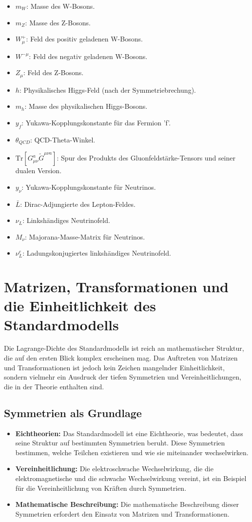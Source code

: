 \documentclass{article}
\begin{document}
\begin{itemize}
		\item $m_W$: Masse des W-Bosons.
		\item $m_Z$: Masse des Z-Bosons.
		\item $W_\mu^+$: Feld des positiv geladenen W-Bosons.
		\item $W^{-\mu}$: Feld des negativ geladenen W-Bosons.
		\item $Z_\mu$: Feld des Z-Bosons.
		\item $h$: Physikalisches Higgs-Feld (nach der Symmetriebrechung).
		\item $m_h$: Masse des physikalischen Higgs-Bosons.
		\item $y_f$: Yukawa-Kopplungskonstante für das Fermion 'f'.
		\item $\theta_{QCD}$: QCD-Theta-Winkel.
		\item $\text{Tr}[G_{\mu\nu}^a \tilde{G}^{\mu\nu a}]$: Spur des Produkts des Gluonfeldstärke-Tensors und seiner dualen Version.
		\item $y_\nu$: Yukawa-Kopplungskonstante für Neutrinos.
		\item $\bar{L}$: Dirac-Adjungierte des Lepton-Feldes.
		\item $\nu_L$: Linkshändiges Neutrinofeld.
		\item $M_\nu$: Majorana-Masse-Matrix für Neutrinos.
		\item $\nu_L^c$: Ladungskonjugiertes linkshändiges Neutrinofeld.
	\end{itemize} %
	\section{Matrizen, Transformationen und die Einheitlichkeit des Standardmodells}
	
	Die Lagrange-Dichte des Standardmodells ist reich an mathematischer Struktur, die auf den ersten Blick komplex erscheinen mag. Das Auftreten von Matrizen und Transformationen ist jedoch kein Zeichen mangelnder Einheitlichkeit, sondern vielmehr ein Ausdruck der tiefen Symmetrien und Vereinheitlichungen, die in der Theorie enthalten sind.
	
	\subsection{Symmetrien als Grundlage}
	
	\begin{itemize}
		\item \textbf{Eichtheorien:} Das Standardmodell ist eine Eichtheorie, was bedeutet, dass seine Struktur auf bestimmten Symmetrien beruht. Diese Symmetrien bestimmen, welche Teilchen existieren und wie sie miteinander wechselwirken.
		\item \textbf{Vereinheitlichung:} Die elektroschwache Wechselwirkung, die die elektromagnetische und die schwache Wechselwirkung vereint, ist ein Beispiel für die Vereinheitlichung von Kräften durch Symmetrien.
		\item \textbf{Mathematische Beschreibung:} Die mathematische Beschreibung dieser Symmetrien erfordert den Einsatz von Matrizen und Transformationen.
	\end{itemize}
	
\end{document}

